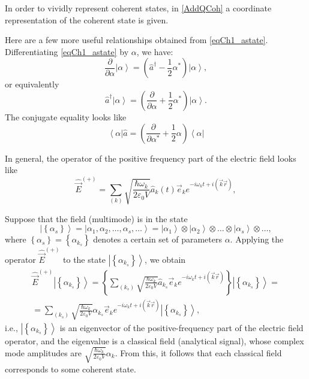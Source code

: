 In order to vividly represent coherent states, in \autoref{AddQCoh} a coordinate representation of the coherent state is given.

Here are a few more useful relationships obtained from \eqref{eqCh1_astate}. Differentiating \eqref{eqCh1_astate} by $\alpha$,
we have:  
\[
\frac{\partial}{\partial \alpha}\left|\alpha\right> = 
\left( \hat{a}^{\dag} - \frac{1}{2}\alpha^{*}\right)\left|\alpha\right>,
\]
or equivalently 
\[
\hat{a}^{\dag}\left|\alpha\right> = \left(\frac{\partial}{\partial
  \alpha} +  \frac{1}{2}\alpha^{*}\right)\left|\alpha\right>.
\]
The conjugate equality looks like
\[
\left<\alpha\right|\hat{a} = \left(\frac{\partial}{\partial
  \alpha^{*}} +  \frac{1}{2}\alpha\right)\left<\alpha\right|
\]

In general, the operator of the positive frequency part of the electric field looks like
\[
\hat{\vec{E}}^{(+)} = \sum_{(k)} \sqrt{\frac{\hbar \omega_k}{2 \varepsilon_0
V}} \hat{a}_k\left(t\right) \vec{e}_k e^{-i \omega_k t + i \left(\vec{k}\vec{r}
  \right)}, 
\]

Suppose that the field (multimode) is in the state
\[
\left| \left\{\alpha_s\right\}\right> = 
\left| \alpha_1, \alpha_2, \dots, \alpha_s, \dots\right> = 
\left| \alpha_1\right>
\otimes
\left| \alpha_2\right>
\otimes
\dots
\otimes
\left| \alpha_s\right>
\otimes
\dots,
\]
where $\left\{\alpha_s\right\}= \left\{\alpha_{k_s}\right\}$
denotes a certain set of parameters $\alpha$. Applying the operator $\hat{\vec{E}}^{(+)}$ to the state $\left|\left\{\alpha_{k_s}\right\}\right>$, we obtain 
\begin{eqnarray}
\hat{\vec{E}}^{(+)}\left|\left\{\alpha_{k_s}\right\}\right> = 
\left\{ \sum_{(k_s)} \sqrt{\frac{\hbar \omega_k}{2 \varepsilon_0
V}} \hat{a}_{k_s} \vec{e}_k e^{-i \omega_k t + i \left(\vec{k}\vec{r}
  \right)}\right\}\left|\left\{\alpha_{k_s}\right\}\right> = 
\nonumber \\
= 
\sum_{(k_s)} \sqrt{\frac{\hbar \omega_k}{2 \varepsilon_0
V}} \alpha_{k_s} \vec{e}_k e^{-i \omega_k t + i \left(\vec{k}\vec{r}
  \right)}\left|\left\{\alpha_{k_s}\right\}\right>,
\end{eqnarray}
i.e., $\left|\left\{\alpha_{k_s}\right\}\right>$ is an eigenvector of the positive-frequency part of the electric field operator, and the eigenvalue is a classical field (analytical signal), whose complex mode amplitudes are  
\(
\sqrt{\frac{\hbar \omega_k}{2 \varepsilon_0
V}} \alpha_k.
\)
From this, it follows that each classical field corresponds to some coherent state.

